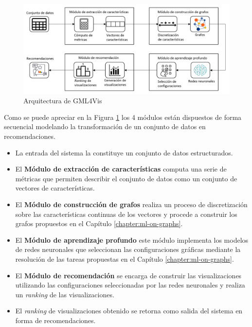 \begin{figure}[h!]
    \includegraphics[width=\linewidth]{Graphics/pipeline.png}
    \caption{Arquitectura de GML4Vis}
    \label{fig: mlg4vis-arch}
\end{figure}

Como se puede apreciar en la Figura \ref{fig: mlg4vis-arch} los
4 m\'odulos est\'an dispuestos de forma secuencial modelando
la transformaci\'on de un conjunto de datos en recomendaciones.

\begin{itemize}
    \item La entrada del sistema la constituye un conjunto de datos estructurados.
    \item El \textbf{M\'odulo de extracci\'on de caracter\'isticas} computa una serie
    de m\'etricas que permiten describir el conjunto de datos como un conjunto de vectores de caracter\'isticas.
    \item El \textbf{M\'odulo de construcci\'on de grafos} realiza un proceso de discretizaci\'on
    sobre las caracter\'isticas continuas de los vectores y procede a construir los grafos propuestos
    en el Cap\'itulo \ref{chapter:ml-on-graphs}.
    \item El \textbf{M\'odulo de aprendizaje profundo} este m\'odulo implementa los modelos
    de redes neuronales que seleccionan las configuraciones gr\'aficas mediante la resoluci\'on
    de las tareas propuestas en el Cap\'itulo \ref{chapter:ml-on-graphs}.
    \item El \textbf{M\'odulo de recomendaci\'on} se encarga de construir las visualizaciones
    utilizando las configuraciones seleccionadas por las redes neuronales y realiza un \textit{ranking}
    de las visualizaciones.
    \item El \textit{ranking} de visualizaciones obtenido se retorna como salida del sistema en forma de
    recomendaciones.
\end{itemize}

